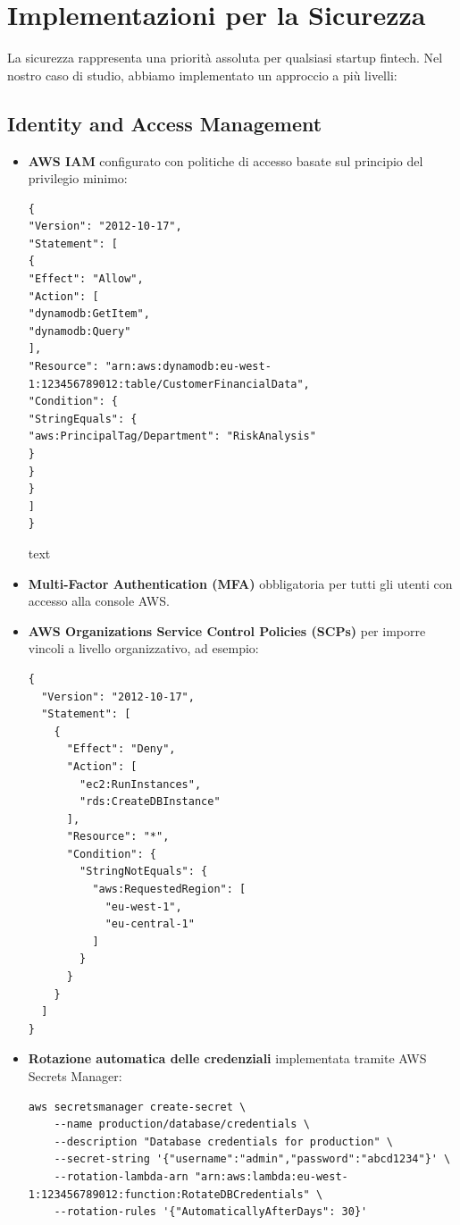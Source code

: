 \documentclass[a4paper,12pt]{report}
\begin{document}
\section{Implementazioni per la Sicurezza}

La sicurezza rappresenta una priorità assoluta per qualsiasi startup fintech. Nel nostro caso di studio, abbiamo implementato un approccio a più livelli:

\subsection{Identity and Access Management}

\begin{itemize}
\item \textbf{AWS IAM} configurato con politiche di accesso basate sul principio del privilegio minimo:
\begin{verbatim}
{
"Version": "2012-10-17",
"Statement": [
{
"Effect": "Allow",
"Action": [
"dynamodb:GetItem",
"dynamodb:Query"
],
"Resource": "arn:aws:dynamodb:eu-west-1:123456789012:table/CustomerFinancialData",
"Condition": {
"StringEquals": {
"aws:PrincipalTag/Department": "RiskAnalysis"
}
}
}
]
}
\end{verbatim}

text
\item \textbf{Multi-Factor Authentication (MFA)} obbligatoria per tutti gli utenti con accesso alla console AWS.

\item \textbf{AWS Organizations Service Control Policies (SCPs)} per imporre vincoli a livello organizzativo, ad esempio:
\begin{verbatim}
{
  "Version": "2012-10-17",
  "Statement": [
    {
      "Effect": "Deny",
      "Action": [
        "ec2:RunInstances",
        "rds:CreateDBInstance"
      ],
      "Resource": "*",
      "Condition": {
        "StringNotEquals": {
          "aws:RequestedRegion": [
            "eu-west-1",
            "eu-central-1"
          ]
        }
      }
    }
  ]
}
\end{verbatim}

\item \textbf{Rotazione automatica delle credenziali} implementata tramite AWS Secrets Manager:
\begin{verbatim}
aws secretsmanager create-secret \
    --name production/database/credentials \
    --description "Database credentials for production" \
    --secret-string '{"username":"admin","password":"abcd1234"}' \
    --rotation-lambda-arn "arn:aws:lambda:eu-west-1:123456789012:function:RotateDBCredentials" \
    --rotation-rules '{"AutomaticallyAfterDays": 30}'
\end{verbatim}
\end{itemize}
\end{document}
